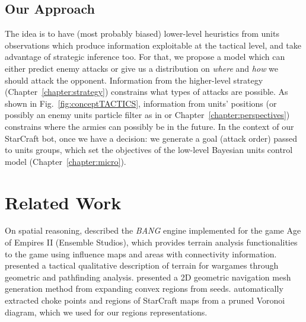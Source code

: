 \subsection{Our Approach}
The idea is to have (most probably biased) lower-level heuristics from units observations which produce information exploitable at the tactical level, and take advantage of strategic inference too. 
For that, we propose a model which can either predict enemy attacks or give us a distribution on \textit{where} and \textit{how} we should attack the opponent. Information from the higher-level strategy \citep{SYNNAEVE:StratPred,SYNNAEVE:OpeningPred} (Chapter~\ref{chapter:strategy}) constrains what types of attacks are possible. As shown in Fig.~\ref{fig:conceptTACTICS}, information from units' positions (or possibly an enemy units particle filter as in \citep{weber2011aiide} or Chapter~\ref{chapter:perspectives}) constrains where the armies can possibly be in the future. In the context of our StarCraft bot, once we have a decision: we generate a goal (attack order) passed to units groups, which set the objectives of the low-level Bayesian units control model \citep{SYNNAEVE:Micro} (Chapter~\ref{chapter:micro}).



\section{Related Work}

On spatial reasoning, \cite{Pottinger00} described the \textit{BANG} engine implemented for the game Age of Empires II (Ensemble Studios), which provides terrain analysis functionalities to the game using influence maps and areas with connectivity information. 
\cite{Forbus2002} presented a tactical qualitative description of terrain for wargames through geometric and pathfinding analysis. \cite{Hale08} presented a 2D geometric navigation mesh generation method from expanding convex regions from seeds. \cite{Perkins2010} automatically extracted choke points and regions of StarCraft maps from a pruned Voronoi diagram, which we used for our regions representations. 

